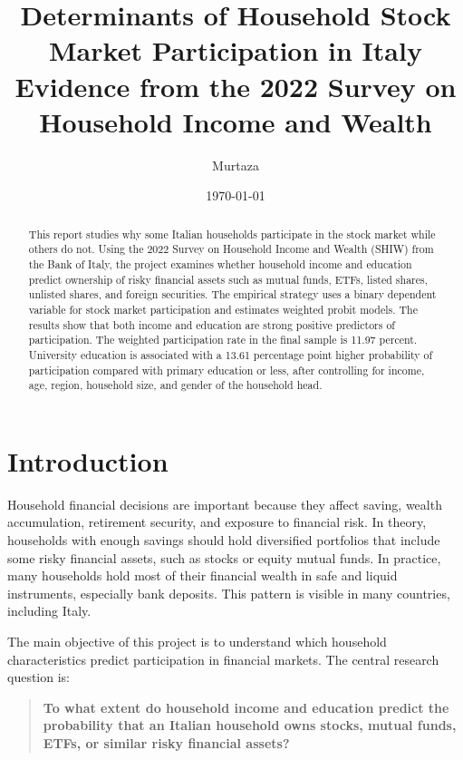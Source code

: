 \documentclass[12pt]{article}
\title{\textbf{Determinants of Household Stock Market Participation in Italy}\\
\large Evidence from the 2022 Survey on Household Income and Wealth}
\author{Murtaza}
\date{\today}
\begin{document}
\maketitle

\tableofcontents
\newpage

\begin{abstract}
This report studies why some Italian households participate in the stock market while others do not. Using the 2022 Survey on Household Income and Wealth (SHIW) from the Bank of Italy, the project examines whether household income and education predict ownership of risky financial assets such as mutual funds, ETFs, listed shares, unlisted shares, and foreign securities. The empirical strategy uses a binary dependent variable for stock market participation and estimates weighted probit models. The results show that both income and education are strong positive predictors of participation. The weighted participation rate in the final sample is 11.97 percent. University education is associated with a 13.61 percentage point higher probability of participation compared with primary education or less, after controlling for income, age, region, household size, and gender of the household head.
\end{abstract}

\section{Introduction}

Household financial decisions are important because they affect saving, wealth accumulation, retirement security, and exposure to financial risk. In theory, households with enough savings should hold diversified portfolios that include some risky financial assets, such as stocks or equity mutual funds. In practice, many households hold most of their financial wealth in safe and liquid instruments, especially bank deposits. This pattern is visible in many countries, including Italy.

The main objective of this project is to understand which household characteristics predict participation in financial markets. The central research question is:

\begin{quote}
\textbf{To what extent do household income and education predict the probability that an Italian household owns stocks, mutual funds, ETFs, or similar risky financial assets?}
\end{quote}
\end{document}
